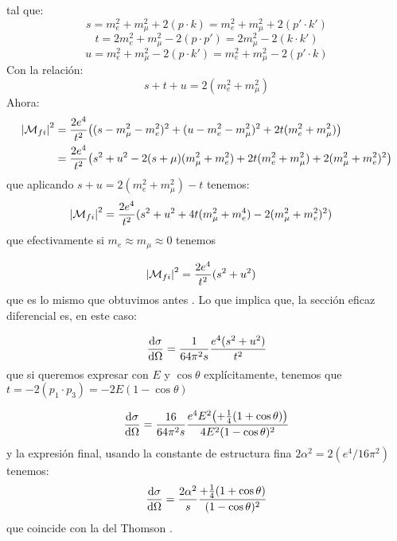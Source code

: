 tal que:
\begin{equation}
	s = m_e^2 + m_\mu^2 +2 (p \cdot k) = m_e^2 + m_\mu^2 + 2 (p' \cdot k')
\end{equation}
\begin{equation}
	t = 2m_e^2 + m_\mu^2 -2 (p \cdot p') = 2m_\mu^2 - 2 (k \cdot k')
\end{equation}
\begin{equation}
	u = m_e^2 + m_\mu^2 -2 (p \cdot k') = m_e^2 + m_\mu^2 - 2 (p'\cdot k)
\end{equation}
Con la relación:
\begin{equation}
	s+t+u = 2(m_e^2 + m_\mu^2)
\end{equation}
Ahora:
\begin{align}
	\vqty{\Mcal_{fi}}^2 & = \frac{2e^4}{t^2} \pqty{(s-m_\mu^2-m_e^2)^2 + (u-m_e^2-m_\mu^2)^2  +  2 t(m_e^2 + m_\mu^2)}        \\
	    & = \frac{2e^4}{t^2} \pqty{s^2 + u^2 - 2(s+\mu)(m_\mu^2 +m_e^2) +  2 t(m_e^2 + m_\mu^2) + 2(m_\mu^2 +m_e^2)^2}
\end{align}
que aplicando $ s+u = 2(m_e^2 + m_\mu^2) -t$ tenemos:
\begin{align}
	\vqty{\Mcal_{fi}}^2 & = \frac{2e^4}{t^2} (s^2 + u^2 + 4t(m_\mu^2 + m_e^4) - 2(m_\mu^2+m_e^2)^2)
\end{align}
que efectivamente si $m_e \approx m_\mu \approx 0$ tenemos

\begin{align}
	\vqty{\Mcal_{fi}}^2 & = \frac{2e^4}{t^2} (s^2 + u^2 )
\end{align}
que es lo mismo que obtuvimos antes \cite{Williams_2022}. Lo que implica que, la sección eficaz diferencial es, en este caso:

\begin{equation}
    \dv{\sigma}{\Omega} = \frac{1}{64\pi^2 s} \frac{e^4 (s^2 + u^2)}{t^2}
\end{equation}
que si queremos expresar con $E$ y $\cos \theta$ explícitamente, tenemos que $t=-2(p_1\cdot p_3)=-2E(1-\cos \theta)$

\begin{equation}
    \dv{\sigma}{\Omega} = \frac{16}{64\pi^2 s} \frac{ e^4 E^2 \pqty{+\frac{1}{4}(1+\cos \theta)}}{4E^2(1-\cos \theta)^2}
\end{equation}
y la expresión final, usando la constante de estructura fina $2\alpha^2 = 2(e^4/16\pi^2)$ tenemos: 
\begin{equation}
    \dv{\sigma}{\Omega} = \frac{2\alpha^2}{s} \frac{{+\frac{1}{4}(1+\cos \theta)}}{(1-\cos \theta)^2}
\end{equation}
que coincide con la del Thomson \cite{thomson_modern_physics}.

